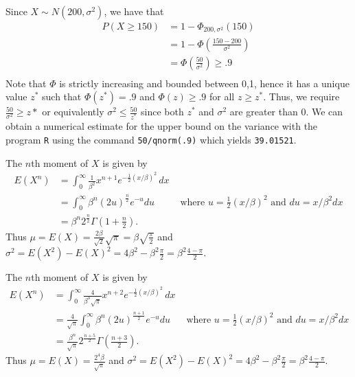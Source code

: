 \documentclass{homework}
\begin{document}
\begin{solution}
  Since $X\sim N(200,\sigma^2)$, we have that 
  \begin{align*}
    P(X\ge 150) &= 1 - \Phi_{200,\sigma^2}(150) \\
    &= 1-\Phi\left(\frac{150-200}{\sigma^2}\right) \\
    &= \Phi\left(\frac{50}{\sigma^2}\right) \ge .9 \\
  \end{align*}
  Note that $\Phi$ is strictly increasing and bounded between 0,1, hence it has a unique value $z^*$ such that $\Phi(z^*) = .9$ and $\Phi(z) \ge .9$ for all $z \ge z^*$.  Thus, we require $\frac{50}{\sigma^2} \ge z*$ or equivalently $\sigma^2\le \frac{50}{z^*}$ since both $z^*$ and $\sigma^2$ are greater than 0.  We can obtain a numerical estimate for the upper bound on the variance with the program \texttt{R} using the command \texttt{50/qnorm(.9)} which yields \texttt{39.01521}.
\end{solution}


\begin{solution}
The $n$th moment of $X$ is given by
\begin{align*}
E(X^n) &= \int_0^\infty \frac{1}{\beta^2} x^{n+1} e^{-\frac12 (x/\beta)^2}\,dx\\
  &= \int_0^\infty \beta^n (2u)^{\frac n2} e^{-u}du &\text{ where }u = \frac12 (x/\beta)^2\text{ and }du = x/\beta^2 dx \\
  &= \beta^{n}2^{\frac n2} \Gamma\left(1+\frac n2\right).
\end{align*}
Thus $\mu = E(X) = \frac {2\beta}{ \sqrt 2} \sqrt{\pi} = \beta\sqrt{\frac{\pi}{2}}$ and $\sigma^2 = E(X^2) - E(X)^2 = 4 \beta^2 - \beta^2 \frac{\pi}{2} = \beta^2\frac{4-\pi}{2}$.
\end{solution}
\newpage


\begin{solution}
The $n$th moment of $X$ is given by
\begin{align*}
E(X^n) &= \int_0^\infty \frac{4}{\beta^3 \sqrt\pi} x^{n+2} e^{-\frac12 (x/\beta)^2}\,dx\\
  &= \frac 4{\sqrt\pi}\int_0^\infty \beta^n (2u)^{\frac{n+1}{2}} e^{-u}du &\text{ where }u = \frac12 (x/\beta)^2\text{ and }du = x/\beta^2 dx \\
  &= \frac {\beta^n}{\sqrt\pi}2^{\frac {n+5}2} \Gamma\left(\frac {n+3}2\right).
\end{align*}
Thus $\mu = E(X) = \frac {2^4\beta}{ \sqrt \pi} $ and $\sigma^2 = E(X^2) - E(X)^2 = 4 \beta^2 - \beta^2 \frac{\pi}{2} = \beta^2\frac{4-\pi}{2}$.
\end{solution}
\end{document}
